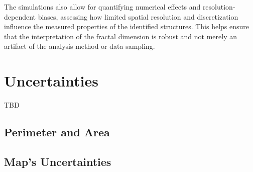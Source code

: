 The simulations also allow for quantifying numerical effects and resolution-dependent biases, assessing how limited spatial resolution and discretization influence the measured properties of the identified structures. This helps ensure that the interpretation of the fractal dimension is robust and not merely an artifact of the analysis method or data sampling.

\section{Uncertainties}

TBD

\subsection{Perimeter and Area}

\subsection{Map's Uncertainties}
